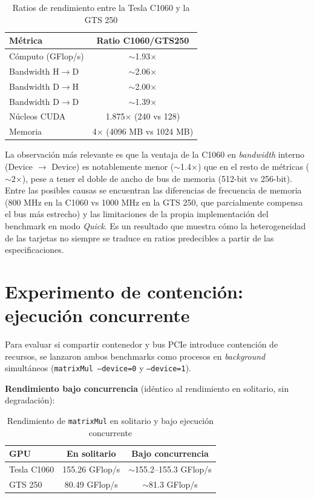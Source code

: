 \begin{table}[htbp]
\centering
\begin{tabular}{|l|c|}
\hline
\textbf{Métrica} & \textbf{Ratio C1060/GTS250} \\
\hline
Cómputo (GFlop/s) & $\sim$1.93$\times$ \\
\hline
Bandwidth H$\rightarrow$D & $\sim$2.06$\times$ \\
\hline
Bandwidth D$\rightarrow$H & $\sim$2.00$\times$ \\
\hline
Bandwidth D$\rightarrow$D & $\sim$1.39$\times$ \\
\hline
Núcleos CUDA & 1.875$\times$ (240 vs 128) \\
\hline
Memoria & 4$\times$ (4096 MB vs 1024 MB) \\
\hline
\end{tabular}
\caption{Ratios de rendimiento entre la Tesla C1060 y la GTS 250}
\label{tab:ratios}
\end{table}

La observación más relevante es que la ventaja de la C1060 en \textit{bandwidth} interno (Device $\rightarrow$ Device) es notablemente menor ($\sim$1.4$\times$) que en el resto de métricas ($\sim$2$\times$), pese a tener el doble de ancho de bus de memoria (512-bit vs 256-bit). Entre las posibles causas se encuentran las diferencias de frecuencia de memoria (800 MHz en la C1060 vs 1000 MHz en la GTS 250, que parcialmente compensa el bus más estrecho) y las limitaciones de la propia implementación del benchmark en modo \textit{Quick}. Es un resultado que muestra cómo la heterogeneidad de las tarjetas no siempre se traduce en ratios predecibles a partir de las especificaciones.

\section{Experimento de contención: ejecución concurrente}

Para evaluar si compartir contenedor y bus PCIe introduce contención de recursos, se lanzaron ambos benchmarks como procesos en \textit{background} simultáneos (\texttt{matrixMul --device=0} y \texttt{--device=1}).

\textbf{Rendimiento bajo concurrencia} (idéntico al rendimiento en solitario, sin degradación):

\begin{table}[htbp]
\centering
\begin{tabular}{|l|c|c|}
\hline
\textbf{GPU} & \textbf{En solitario} & \textbf{Bajo concurrencia} \\
\hline
Tesla C1060 & 155.26 GFlop/s & $\sim$155.2--155.3 GFlop/s \\
\hline
GTS 250 & 80.49 GFlop/s & $\sim$81.3 GFlop/s \\
\hline
\end{tabular}
\caption{Rendimiento de \texttt{matrixMul} en solitario y bajo ejecución concurrente}
\label{tab:contention}
\end{table}

